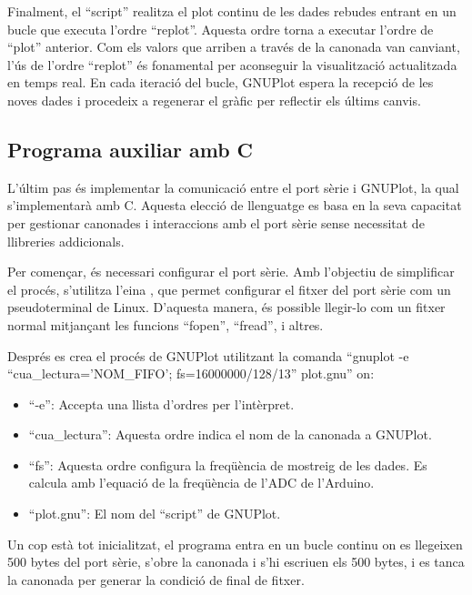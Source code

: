 \documentclass{tfgitic}[2023/06/30]
\begin{document}
Finalment, el ``script'' realitza el plot continu de les dades rebudes
entrant en un bucle que executa l'ordre ``replot''. Aquesta ordre
torna a executar l'ordre de ``plot'' anterior. Com els valors que
arriben a través de la canonada van canviant, l'ús de l'ordre
``replot'' és fonamental per aconseguir la visualització actualitzada
en temps real. En cada iteració del bucle, GNUPlot espera la recepció
de les noves dades i procedeix a regenerar el gràfic per reflectir els
últims canvis.

\newpage

\subsection{Programa auxiliar amb C}

L'últim pas és implementar la comunicació entre el port sèrie i
GNUPlot, la qual s'implementarà amb C. Aquesta elecció de llenguatge
es basa en la seva capacitat per gestionar canonades i interaccions
amb el port sèrie sense necessitat de llibreries addicionals.

Per començar, és necessari configurar el port sèrie. Amb l'objectiu
de simplificar el procés, s'utilitza l'eina \cite[``stty'']{stty}, que
permet configurar el fitxer del port sèrie com un pseudoterminal de
Linux. D'aquesta manera, és possible llegir-lo com un fitxer normal
mitjançant les funcions ``fopen'', ``fread'', i altres.

Després es crea el procés de GNUPlot utilitzant la comanda ``gnuplot
-e ``cua\_lectura='NOM\_FIFO'; fs=16000000/128/13'' plot.gnu'' on:
\begin{itemize}
      \item ``-e'': Accepta una llista d'ordres per l'intèrpret.
      \item ``cua\_lectura'': Aquesta ordre indica el nom de la
            canonada a GNUPlot.
      \item ``fs'': Aquesta ordre configura la freqüència de mostreig de
            les dades. Es calcula amb l'equació de la freqüència de l'ADC de
            l'Arduino.
      \item ``plot.gnu'': El nom del ``script'' de GNUPlot.
\end{itemize}

Un cop està tot inicialitzat, el programa entra en un bucle continu on
es llegeixen 500 bytes del port sèrie, s'obre la canonada i s'hi
escriuen els 500 bytes, i es tanca la canonada per generar la condició
de final de fitxer.
\end{document}
